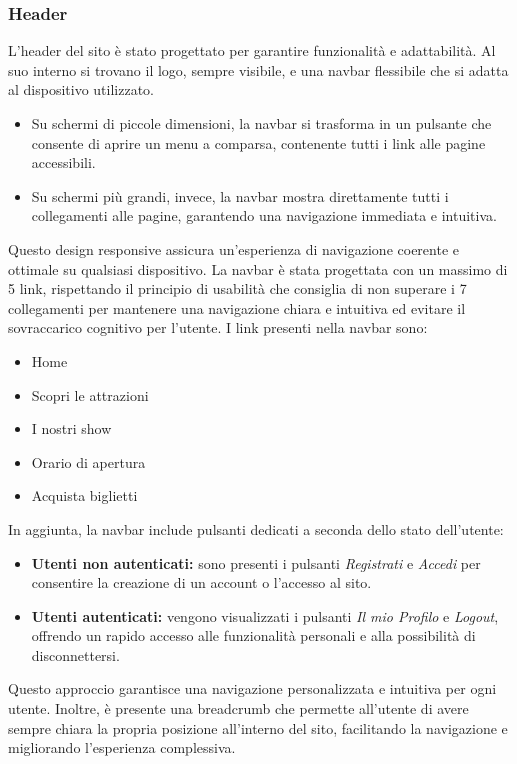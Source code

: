 \subsubsection{Header}
L’header del sito è stato progettato per garantire funzionalità e adattabilità. Al suo interno si trovano il logo, sempre visibile, e una navbar flessibile che si adatta al dispositivo utilizzato.
\begin{itemize}
    \item Su schermi di piccole dimensioni, la navbar si trasforma in un pulsante che consente di aprire un menu a comparsa, contenente tutti i link alle pagine accessibili.
    \item Su schermi più grandi, invece, la navbar mostra direttamente tutti i collegamenti alle pagine, garantendo una navigazione immediata e intuitiva.
\end{itemize}
Questo design responsive assicura un’esperienza di navigazione coerente e ottimale su qualsiasi dispositivo. 
La navbar è stata progettata con un massimo di 5 link, rispettando il principio di usabilità che consiglia di non superare i 7 collegamenti per mantenere una navigazione chiara e intuitiva ed evitare il sovraccarico cognitivo per l'utente. I link presenti nella navbar sono:
\begin{itemize}
    \item Home
    \item Scopri le attrazioni
    \item I nostri show
    \item Orario di apertura
    \item Acquista biglietti
\end{itemize}
In aggiunta, la navbar include pulsanti dedicati a seconda dello stato dell'utente:
\begin{itemize}
    \item \textbf{Utenti non autenticati:} sono presenti i pulsanti \textit{Registrati} e \textit{Accedi} per consentire la creazione di un account o l’accesso al sito.
    \item \textbf{Utenti autenticati:} vengono visualizzati i pulsanti \textit{Il mio Profilo} e \textit{Logout}, offrendo un rapido accesso alle funzionalità personali e alla possibilità di disconnettersi.
\end{itemize}
Questo approccio garantisce una navigazione personalizzata e intuitiva per ogni utente.
Inoltre, è presente una breadcrumb che permette all'utente di avere sempre chiara la propria posizione all'interno del sito, facilitando la navigazione e migliorando l’esperienza complessiva.
